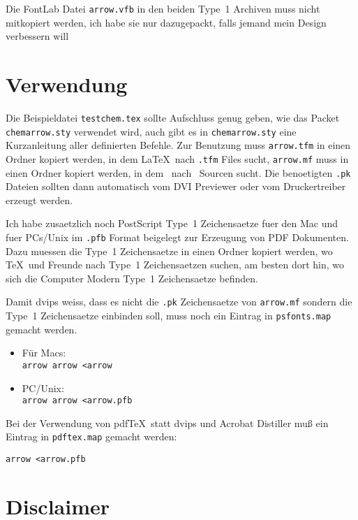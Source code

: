 \documentclass[german, DIV=9, pagesize=auto]{scrartcl}
\begin{document}
\medskip

Die FontLab Datei \texttt{arrow.vfb} in den beiden Type~1 Archiven muss nicht mitkopiert 
werden, ich habe sie nur dazugepackt, falls jemand mein Design verbessern 
will \smiley


\section{Verwendung}

Die Beispieldatei \texttt{testchem.tex} sollte Aufschluss genug geben, wie das Packet 
\texttt{chemarrow.sty} verwendet wird, auch gibt es in \texttt{chemarrow.sty} eine 
Kurzanleitung aller definierten Befehle. Zur Benutzung muss \texttt{arrow.tfm} in 
einen Ordner kopiert werden, in dem \LaTeX\ nach \texttt{.tfm} Files sucht, \texttt{arrow.mf}
muss in einen Ordner kopiert werden, in dem \MF\ nach \MF\ Sourcen 
sucht. Die benoetigten \texttt{.pk} Dateien sollten dann automatisch vom DVI 
Previewer oder vom Druckertreiber erzeugt  werden.

Ich habe zusaetzlich noch PostScript Type~1 Zeichensaetze fuer den Mac und fuer
PCs/Unix im \texttt{.pfb} Format beigelegt zur Erzeugung von PDF Dokumenten. Dazu muessen 
die Type~1 Zeichensaetze in einen Ordner kopiert werden, wo \TeX\ und Freunde 
nach Type~1 Zeichensaetzen suchen, am besten dort hin, wo sich die Computer 
Modern Type~1 Zeichensaetze befinden.

Damit dvips weiss, dass es nicht die \texttt{.pk} Zeichensaetze von \texttt{arrow.mf} sondern 
die Type~1 Zeichensaetze einbinden soll, muss noch ein Eintrag in 
\texttt{psfonts.map} gemacht werden. 
%
\begin{itemize}
\item Für Macs:\\
  \verb+arrow arrow <arrow+
  
\item PC/Unix:\\
  \verb+arrow arrow <arrow.pfb+
\end{itemize}

Bei der Verwendung von pdf\TeX\ statt dvips und Acrobat Distiller muß ein 
Eintrag in \texttt{pdftex.map} gemacht werden:
%
\begin{verbatim}
arrow <arrow.pfb
\end{verbatim}


\section{Disclaimer}
\end{document}
